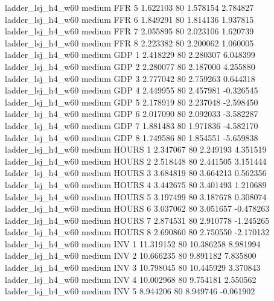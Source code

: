   ladder_lsj_h4_w60     medium      FFR                 5  1.622103 80       1.578154           2.784827
  ladder_lsj_h4_w60     medium      FFR                 6  1.849291 80       1.814136           1.937815
  ladder_lsj_h4_w60     medium      FFR                 7  2.055895 80       2.023106           1.620739
  ladder_lsj_h4_w60     medium      FFR                 8  2.223382 80       2.200062           1.060005
  ladder_lsj_h4_w60     medium      GDP                 1  2.418229 80       2.280307           6.048399
  ladder_lsj_h4_w60     medium      GDP                 2  2.280077 80       2.187000           4.255880
  ladder_lsj_h4_w60     medium      GDP                 3  2.777042 80       2.759263           0.644318
  ladder_lsj_h4_w60     medium      GDP                 4  2.449955 80       2.457981          -0.326545
  ladder_lsj_h4_w60     medium      GDP                 5  2.178919 80       2.237048          -2.598450
  ladder_lsj_h4_w60     medium      GDP                 6  2.017090 80       2.092033          -3.582287
  ladder_lsj_h4_w60     medium      GDP                 7  1.881483 80       1.971836          -4.582170
  ladder_lsj_h4_w60     medium      GDP                 8  1.749586 80       1.854551          -5.659838
  ladder_lsj_h4_w60     medium    HOURS                 1  2.347067 80       2.249193           4.351519
  ladder_lsj_h4_w60     medium    HOURS                 2  2.518448 80       2.441505           3.151444
  ladder_lsj_h4_w60     medium    HOURS                 3  3.684819 80       3.664213           0.562356
  ladder_lsj_h4_w60     medium    HOURS                 4  3.442675 80       3.401493           1.210689
  ladder_lsj_h4_w60     medium    HOURS                 5  3.197499 80       3.187678           0.308074
  ladder_lsj_h4_w60     medium    HOURS                 6  3.037062 80       3.051657          -0.478263
  ladder_lsj_h4_w60     medium    HOURS                 7  2.874531 80       2.910778          -1.245265
  ladder_lsj_h4_w60     medium    HOURS                 8  2.690860 80       2.750550          -2.170132
  ladder_lsj_h4_w60     medium      INV                 1 11.319152 80      10.386258           8.981994
  ladder_lsj_h4_w60     medium      INV                 2 10.666235 80       9.891182           7.835800
  ladder_lsj_h4_w60     medium      INV                 3 10.798045 80      10.445929           3.370843
  ladder_lsj_h4_w60     medium      INV                 4 10.002968 80       9.754181           2.550562
  ladder_lsj_h4_w60     medium      INV                 5  8.944206 80       8.949746          -0.061902
